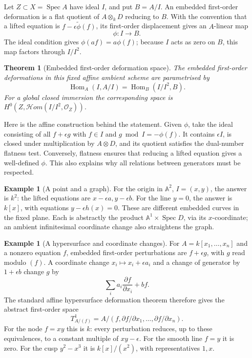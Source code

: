 \documentclass[11pt,a4paper]{article}
\numberwithin{equation}{section}
\newtheorem{theorem}[definition]{Theorem}
\theoremstyle{definition}
\newtheorem{example}[definition]{Example}
\newcommand{\A}{\mathbb A}
\newcommand{\OO}{\mathcal O}
\newcommand{\Spec}{\operatorname{Spec}}
\newcommand{\Hom}{\operatorname{Hom}}
\begin{document}
Let $Z\subset X=\Spec A$ have ideal $I$, and put $B=A/I$. An embedded
first-order deformation is a flat quotient of $A\otimes_kD$ reducing
to $B$. With the convention that a lifted equation is
$f-\epsilon\widetilde\phi(f)$, its first-order displacement gives an
$A$-linear map
\[
\phi:I\longrightarrow B.
\]
The ideal condition gives $\phi(af)=a\phi(f)$; because $I$ acts as zero
on $B$, this map factors through $I/I^2$.

\begin{theorem}[Embedded first-order deformation space]
The embedded first-order deformations in this fixed affine ambient
scheme are parametrised by
\begin{equation}\label{eq:embedded-tangent}
\Hom_A(I,A/I)=\Hom_B(I/I^2,B).
\end{equation}
For a global closed immersion the corresponding space is
$H^0(Z,\mathcal Hom(I/I^2,\OO_Z))$.
\end{theorem}

Here is the affine construction behind the statement. Given $\phi$,
take the ideal consisting of all $f+\epsilon g$ with $f\in I$ and
$g\bmod I=-\phi(f)$. It contains $\epsilon I$, is closed under
multiplication by $A\otimes D$, and its quotient satisfies the
dual-number flatness test. Conversely, flatness ensures that reducing
a lifted equation gives a well-defined $\phi$. This also explains why
all relations between generators must be respected.

\begin{example}[A point and a graph]
For the origin in $\A^2$, $I=(x,y)$, the answer is $k^2$:
the lifted equations are $x-\epsilon a,y-\epsilon b$.
For the line $y=0$, the answer is $k[x]$, with equations
$y-\epsilon h(x)=0$. These are different embedded curves in the fixed
plane. Each is abstractly the product $\A^1\times\Spec D$, via its
$x$-coordinate; an ambient infinitesimal coordinate change also
straightens the graph.
\end{example}

\begin{example}[A hypersurface and coordinate changes]
For $A=k[x_1,\ldots,x_n]$ and a nonzero equation $f$, embedded
first-order perturbations are $f+\epsilon g$, with $g$ read modulo
$(f)$. A coordinate change $x_i\mapsto x_i+\epsilon a_i$ and a change
of generator by $1+\epsilon b$ change $g$ by
\[
\sum_i a_i\frac{\partial f}{\partial x_i}+bf.
\]
The standard affine hypersurface deformation theorem therefore gives
the abstract first-order space
\begin{equation}\label{eq:hypersurface-t1}
T^1_{A/(f)}=A/(f,\partial f/\partial x_1,\ldots,\partial f/\partial x_n).
\end{equation}
For the node $f=xy$ this is $k$: every perturbation reduces, up to these
equivalences, to a constant multiple of $xy-\epsilon$. For the smooth
line $f=y$ it is zero. For the cusp $y^2-x^3$ it is
$k[x]/(x^2)$, with representatives $1,x$.
\end{example}
\end{document}
